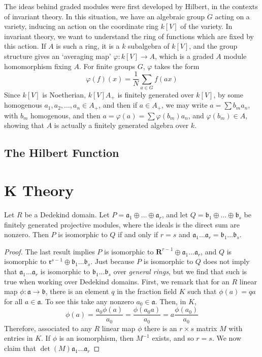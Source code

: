 The ideas behind graded modules were first developed by Hilbert, in the contexts of invariant theory. In this situation, we have an algebraic group $G$ acting on a variety, inducing an action on the coordinate ring $k[V]$ of the variety. In invariant theory, we want to understand the ring of functions which are fixed by this action. If $A$ is such a ring, it is a $k$ subalgebra of $k[V]$, and the group structure gives an `averaging map' $\varphi: k[V] \to A$, which is a graded $A$ module homomorphism fixing $A$. For finite groups $G$, $\varphi$ takes the form
%
\[ \varphi(f)(x) = \frac{1}{N} \sum_{a \in G} f(ax) \]
%
Since $k[V]$ is Noetherian, $k[V] A_+$ is finitely generated over $k[V]$, by some homogenous $a_1, a_2, \dots, a_n \in A_+$, and then if $a \in A_+$, we may write $a = \sum b_m a_n$, with $b_m$ homogenous, and then $a = \varphi(a) = \sum \varphi(b_m) a_n$, and $\varphi(b_m) \in A$, showing that $A$ is actually a finitely generated algebra over $k$.

\section{The Hilbert Function}

\chapter{K Theory}

\begin{theorem}[Steinitz]
    Let $R$ be a Dedekind domain. Let $P = \mathfrak{a}_1 \oplus \dots \oplus \mathfrak{a}_r$, and let $Q = \mathfrak{b}_1 \oplus \dots \oplus \mathfrak{b}_s$ be finitely generated projective modules, where the ideals is the direct sum are nonzero. Then $P$ is isomorphic to $Q$ if and only if $r = s$ and $\mathfrak{a}_1 \dots \mathfrak{a}_r = \mathfrak{b}_1 \dots \mathfrak{b}_s$.
\end{theorem}
\begin{proof}
    The last result implies $P$ is isomorphic to $\mathbf{R}^{r-1} \oplus \mathfrak{a}_1 \dots \mathfrak{a}_r$, and $Q$ is isomorphic to $\mathfrak{r}^{s-1} \oplus \mathfrak{b}_1 \dots \mathfrak{b}_s$. Just because $P$ is isomorphic to $Q$ does not imply that $\mathfrak{a}_1 \dots \mathfrak{a}_r$ is isomorphic to $\mathfrak{b}_1 \dots \mathfrak{b}_s$ over {\it general rings}, but we find that such is true when working over Dedekind domains. First, we remark that for an $R$ linear map $\phi: \mathfrak{a} \to \mathfrak{b}$, there is an element $q$ in the fraction field $K$ such that $\phi(a) = qa$ for all $a \in \mathfrak{a}$. To see this take any nonzero $a_0 \in \mathfrak{a}$. Then, in $K$,
    \[ \phi(a) = \frac{a_0 \phi(a)}{a_0} = \frac{\phi(a_0 a)}{a_0} = a \frac{\phi(a_0)}{a_0} \]
    Therefore, associated to any $R$ linear map $\phi$ there is an $r \times s$ matrix $M$ with entries in $K$. If $\phi$ is an isomorphism, then $M^{-1}$ exists, and so $r = s$. We now claim that $\det(M) \mathfrak{a}_1 \dots \mathfrak{a}_r$
\end{proof}

